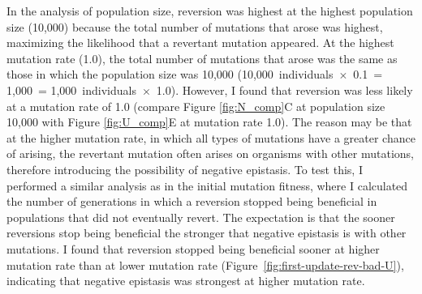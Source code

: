 \begin{doublespace}
In the analysis of population size, reversion was highest
at the highest population size (10,000) because
the total number of mutations that arose was highest,
maximizing the likelihood that a revertant mutation appeared.
%
At the highest mutation rate (1.0),
the total number of mutations that arose was the same
as those in which the population size was 10,000
(10,000~individuals~$\times$~0.1~= 1,000~= 1,000~individuals~$\times$~1.0).
%
However, I found that reversion was less likely at a mutation rate of 1.0
(compare Figure \ref{fig:N_comp}C at population size 10,000
with Figure \ref{fig:U_comp}E at mutation rate 1.0).
%
The reason may be that at the higher mutation rate,
in which all types of mutations have a greater chance of arising,
the revertant mutation often arises on organisms with other mutations,
therefore introducing the possibility of negative epistasis.
%
To test this, I performed a similar analysis as in the initial mutation
fitness, where I calculated the number of generations in which a reversion
stopped being beneficial in populations that did not eventually revert.
%
The expectation is that the sooner reversions stop being beneficial
the stronger that negative epistasis is with other mutations.
%
I found that reversion stopped being beneficial sooner
at higher mutation rate than at lower mutation rate
(Figure~\ref{fig:first-update-rev-bad-U}),
indicating that negative epistasis was strongest at higher mutation rate.




\end{doublespace}
